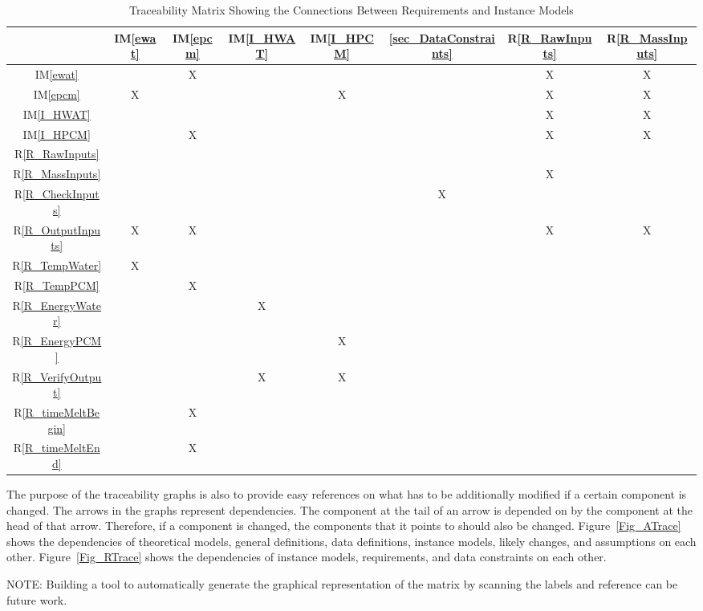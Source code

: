 \documentclass[12pt]{article}
\newcommand{\iref}[1]{IM\ref{#1}}
\newcommand{\rref}[1]{R\ref{#1}}
\begin{document}
\begin{table}[h!]
\centering
\begin{tabular}{|c|c|c|c|c|c|c|c|}
\hline
	& \iref{ewat}& \iref{epcm}& \iref{I_HWAT}& \iref{I_HPCM}& \ref{sec_DataConstraints}& \rref{R_RawInputs}& \rref{R_MassInputs} \\
\hline
\iref{ewat}            & & X& & & & X& X \\ \hline
\iref{epcm}            & X& & & X& & X& X \\ \hline
\iref{I_HWAT}          & & & & & & X& X \\ \hline
\iref{I_HPCM}          & & X& & & & X& X \\ \hline
\rref{R_RawInputs}     & & & & & & & \\ \hline
\rref{R_MassInputs}    & & & & & & X& \\ \hline
\rref{R_CheckInputs}   & & & & & X& & \\ \hline
\rref{R_OutputInputs}  & X& X& & & & X& X \\ \hline
\rref{R_TempWater}     & X& & & & & & \\ \hline 
\rref{R_TempPCM}       & & X& & & & & \\ \hline
\rref{R_EnergyWater}   & & & X& & & & \\ \hline
\rref{R_EnergyPCM}     & & & & X& & & \\ \hline
\rref{R_VerifyOutput}  & & & X& X& & & \\ \hline
\rref{R_timeMeltBegin} & & X& & & & & \\ \hline
\rref{R_timeMeltEnd}   & & X& & & & & \\ 
\hline
\end{tabular}
\caption{Traceability Matrix Showing the Connections Between Requirements and Instance Models}
\label{Table:R_trace}
\end{table}

The purpose of the traceability graphs is also to provide easy references on what has to be 
additionally modified if a certain component is changed.  The arrows in the graphs
represent dependencies. The component at the tail of an arrow is depended on by the
component at the head of that arrow. Therefore, if a component is changed, the 
components that it points to should also be changed. Figure~\ref{Fig_ATrace} shows
the dependencies of theoretical models, general definitions, data definitions, 
instance models, likely changes, and assumptions on each other. Figure~\ref{Fig_RTrace} shows
the dependencies of instance models, requirements, and data constraints on each other.\par
NOTE: Building a tool to automatically generate the graphical 
representation of the matrix by scanning the labels and reference can be 
future work.
\end{document}
